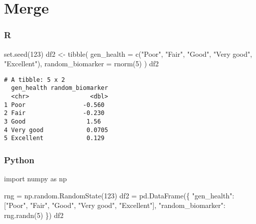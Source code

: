 \documentclass[
  letterpaper,
  DIV=11,
  numbers=noendperiod]{scrreprt}
\newenvironment{Shaded}{\begin{snugshade}}{\end{snugshade}}
\newcommand{\AttributeTok}[1]{\textcolor[rgb]{0.40,0.46,0.14}{#1}}
\newcommand{\DecValTok}[1]{\textcolor[rgb]{0.68,0.00,0.00}{#1}}
\newcommand{\FunctionTok}[1]{\textcolor[rgb]{0.28,0.35,0.67}{#1}}
\newcommand{\ImportTok}[1]{\textcolor[rgb]{0.00,0.46,0.62}{#1}}
\newcommand{\NormalTok}[1]{\textcolor[rgb]{0.00,0.46,0.62}{#1}}
\newcommand{\OperatorTok}[1]{\textcolor[rgb]{0.37,0.37,0.37}{#1}}
\newcommand{\OtherTok}[1]{\textcolor[rgb]{0.00,0.46,0.62}{#1}}
\newcommand{\StringTok}[1]{\textcolor[rgb]{0.13,0.47,0.30}{#1}}
\begin{document}
\hypertarget{merge}{%
\section{Merge}\label{merge}}

\hypertarget{r-33}{%
\subsubsection{R}\label{r-33}}

\begin{Shaded}
\begin{Highlighting}[]
\FunctionTok{set.seed}\NormalTok{(}\DecValTok{123}\NormalTok{)}
\NormalTok{df2 }\OtherTok{\textless{}{-}} \FunctionTok{tibble}\NormalTok{(}
    \AttributeTok{gen\_health =} \FunctionTok{c}\NormalTok{(}\StringTok{"Poor"}\NormalTok{, }\StringTok{"Fair"}\NormalTok{, }\StringTok{"Good"}\NormalTok{, }\StringTok{"Very good"}\NormalTok{, }\StringTok{"Excellent"}\NormalTok{),}
    \AttributeTok{random\_biomarker =} \FunctionTok{rnorm}\NormalTok{(}\DecValTok{5}\NormalTok{)}
\NormalTok{)}
\NormalTok{df2}
\end{Highlighting}
\end{Shaded}

\begin{verbatim}
# A tibble: 5 x 2
  gen_health random_biomarker
  <chr>                 <dbl>
1 Poor                -0.560 
2 Fair                -0.230 
3 Good                 1.56  
4 Very good            0.0705
5 Excellent            0.129 
\end{verbatim}

\hypertarget{python-33}{%
\subsubsection{Python}\label{python-33}}

\begin{Shaded}
\begin{Highlighting}[]
\ImportTok{import}\NormalTok{ numpy }\ImportTok{as}\NormalTok{ np}

\NormalTok{rng }\OperatorTok{=}\NormalTok{ np.random.RandomState(}\DecValTok{123}\NormalTok{)}
\NormalTok{df2 }\OperatorTok{=}\NormalTok{ pd.DataFrame(\{}
    \StringTok{"gen\_health"}\NormalTok{: [}\StringTok{"Poor"}\NormalTok{, }\StringTok{"Fair"}\NormalTok{, }\StringTok{"Good"}\NormalTok{, }\StringTok{"Very good"}\NormalTok{, }\StringTok{"Excellent"}\NormalTok{],}
    \StringTok{"random\_biomarker"}\NormalTok{: rng.randn(}\DecValTok{5}\NormalTok{)}
\NormalTok{\})}
\NormalTok{df2}
\end{Highlighting}
\end{Shaded}
\end{document}
